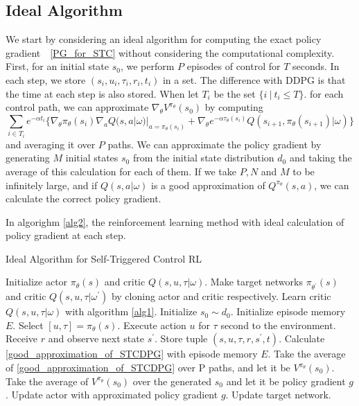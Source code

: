 \documentclass[english, dvipdfmx]{ampmt}             %
\begin{document}
\subsection{Ideal Algorithm}
We start by considering an ideal algorithm for computing the exact policy gradient　\eqref{PG_for_STC} without considering the computational complexity. First, for an initial state $s_0$, we perform $P$ episodes of control for $T$ seconds.  In each step, we store $(s_i, u_i, \tau_i, r_i, t_i)$ in a set. The difference with DDPG is that the time at each step is also stored. When let $T_i$ be the set $\{i~|~t_i \leq T\}$. for each control path, we can approximate $\nabla_{\theta}V^{\pi_{\theta}}(s_0)$ by computing 
\begin{equation}
	\sum_{i\in T_i} e^{-\alpha t_i}\{\nabla_{\theta}\pi_{\theta}(s_i)\nabla_{a}Q(s,a|\omega)|_{a=\pi_{\theta}(s_i)} + \nabla_{\theta}e^{-\alpha\tau_{\theta}(s_{i})}Q(s_{i+1},\pi_{\theta}(s_{i+1})|\omega)\} \label{good_approximation_of_STCDPG}
\end{equation}
and averaging it over $P$ paths. We can approximate the policy gradient by generating $M$ initial states $s_0$ from the initial state distribution $d_0$ and taking the average of this calculation for each of them. If we take $P, N$ and $M$ to be infinitely large, and if $Q(s,a|\omega)$ is a good approximation of $Q^{\pi_{\theta}}(s,a)$, we can calculate the correct policy gradient.\par
In algorighm \ref{alg2}, the reinforcement learning method with ideal calculation of policy gradient at each step. 
\begin{algorithm}                      
\caption{Ideal Algorithm for Self-Triggered Control RL}         
\label{alg2}                          
\begin{algorithmic}                  
    \STATE Initialize actor $\pi_{\theta}(s)$ and critic $Q(s,u,\tau|\omega)$.
    \STATE Make target networks $\pi_{\theta^{\prime}}(s)$ and critic $Q(s,u,\tau|\omega^{\prime})$ by cloning actor and critic respectively.
    \STATE Learn critic $Q(s,u,\tau|\omega)$ with algorithm \ref{alg1}.
            \STATE Initialize $s_0\sim d_0$.
            \STATE Initialize episode memory $E$.
                \STATE Select $[u, \tau] = \pi_{\theta}(s)$.
                \STATE Execute action $u$ for $\tau$ second to the environment.
                \STATE Receive $r$ and observe next state $s^{\prime}$.
                \STATE Store tuple $(s, u, \tau, r, s^{\prime}, t)$.
            \ENDWHILE
            \STATE Calculate \eqref{good_approximation_of_STCDPG} with episode memory $E$.
        \ENDFOR
        \STATE Take the average of \eqref{good_approximation_of_STCDPG} over P paths, and let it be $V^{\pi_{\theta}}(s_0)$.
        \ENDFOR
    \ENDFOR
    \STATE Take the average of $V^{\pi_{\theta}}(s_0)$ over the generated $s_0$ and let it be policy gradient $g$.
    \STATE Update actor with approximated policy gradient $g$.
   \STATE Update target network.
   \end{algorithmic}
\end{algorithm}
\end{document}
